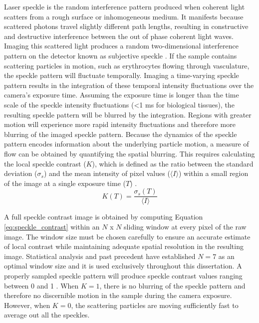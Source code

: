 Laser speckle is the random interference pattern produced when coherent light scatters from a rough surface or inhomogeneous medium. It manifests because scattered photons travel slightly different path lengths, resulting in constructive and destructive interference between the out of phase coherent light waves. Imaging this scattered light produces a random two-dimensional interference pattern on the detector known as subjective speckle \cite{Ennos:1975et}. If the sample contains scattering particles in motion, such as erythrocytes flowing through vasculature, the speckle pattern will fluctuate temporally. Imaging a time-varying speckle pattern results in the integration of these temporal intensity fluctuations over the camera's exposure time. Assuming the exposure time is longer than the time scale of the speckle intensity fluctuations (\textless1 ms for biological tissues), the resulting speckle pattern will be blurred by the integration. Regions with greater motion will experience more rapid intensity fluctuations and therefore more blurring of the imaged speckle pattern. Because the dynamics of the speckle pattern encodes information about the underlying particle motion, a measure of flow can be obtained by quantifying the spatial blurring. This requires calculating the local speckle contrast ($K$), which is defined as the ratio between the standard deviation ($\sigma_s$) and the mean intensity of pixel values ($\langle{I}\rangle$) within a small region of the image at a single exposure time ($T$) \cite{Briers:1996kfa}.
%
\begin{equation}
    \label{eq:speckle_contrast}
    K(T) = \frac{\sigma_s(T)}{\langle{I}\rangle}
\end{equation}

A full speckle contrast image is obtained by computing Equation \ref{eq:speckle_contrast} within an $N$ x $N$ sliding window at every pixel of the raw image. The window size must be chosen carefully to ensure an accurate estimate of local contrast while maintaining adequate spatial resolution in the resulting image. Statistical analysis \cite{Duncan:2008hs} and past precedent \cite{Dunn:2011gi} have established $N = 7$ as an optimal window size and it is used exclusively throughout this dissertation. A properly sampled \cite{Kirkpatrick:2008ke} speckle pattern will produce speckle contrast values ranging between 0 and 1 \cite{Boas:2010vr}. When $K = 1$, there is no blurring of the speckle pattern and therefore no discernible motion in the sample during the camera exposure. However, when $K = 0$, the scattering particles are moving sufficiently fast to average out all the speckles.


